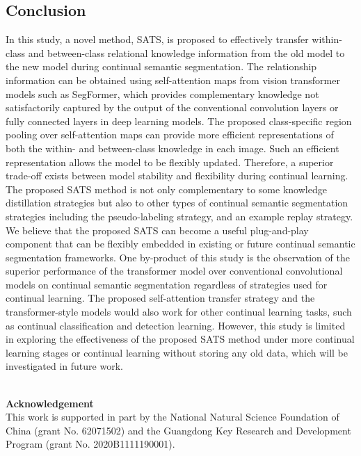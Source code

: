 \documentclass[onecolumn,conference,compsoc]{IEEEtran}
\begin{document}
\begin{spacing}{1.5}
\section{Conclusion}\label{sec:conclusion}

In this study, a novel method, SATS, is proposed to effectively transfer within-class and between-class relational knowledge information from the old model to the new model during continual semantic segmentation. The relationship information can be {obtained using} self-attention maps from vision transformer models such as SegFormer, {which provides complementary knowledge not satisfactorily captured} by the output of the conventional convolution layers or fully connected layers in deep learning models. The proposed class-specific region pooling over self-attention maps can provide more efficient representations of both the within- and between-class knowledge in each image. {Such an efficient representation} allows the model to be flexibly updated. {Therefore, a superior trade-off exists} between model stability and flexibility during continual learning. The proposed SATS method is not only complementary to some knowledge distillation strategies but also to other types of continual semantic segmentation strategies including the pseudo-labeling strategy, and an example replay strategy. We believe that the proposed SATS can become a useful plug-and-play component that can be flexibly embedded in existing or future continual semantic segmentation frameworks. One by-product of this study is the observation of the superior performance of the transformer model over conventional convolutional models on continual semantic segmentation regardless of strategies used for continual learning. The proposed self-attention transfer strategy and the transformer-style models would also work  for other continual learning tasks, such as continual classification and detection learning. However, this study is limited in exploring the effectiveness of the proposed SATS method under more continual learning stages or continual learning without storing any old data, which will be investigated in future work.

\end{spacing}





\noindent \textbf{\\Acknowledgement}\\
This work is supported in part by the National Natural Science Foundation of China (grant No. 62071502) and the Guangdong Key Research and Development Program (grant No. 2020B1111190001).












\end{document}
